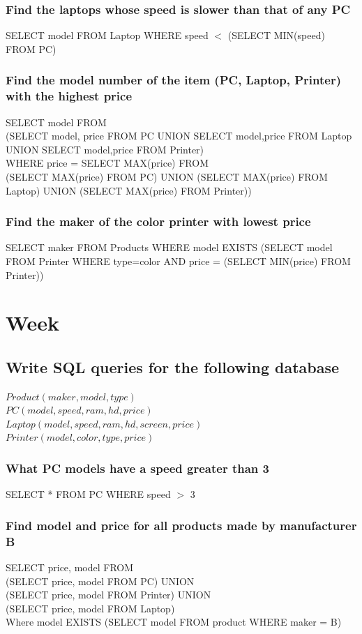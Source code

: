 \documentclass[12pt, a4paper]{article}
\begin{document}
			\subsubsection{Find the laptops whose speed is slower than that of any PC}
				SELECT model FROM Laptop WHERE speed $<$ (SELECT MIN(speed) FROM PC)
			\subsubsection{Find the model number of the item (PC, Laptop, Printer) with the highest price}
				SELECT model FROM \\
					(SELECT model, price FROM PC UNION SELECT model,price FROM Laptop UNION SELECT model,price FROM Printer) \\
					WHERE price = SELECT MAX(price) FROM \\
						(SELECT MAX(price) FROM PC) UNION (SELECT MAX(price) FROM Laptop) UNION  (SELECT MAX(price) FROM Printer)) 
			\subsubsection{Find the maker of the color printer with lowest price}
				SELECT maker FROM Products WHERE model EXISTS (SELECT model FROM Printer WHERE type=color AND price = (SELECT MIN(price) FROM Printer))
	\section{Week}
		\subsection{Write SQL queries for the following database}
			$Product(maker, model, type)$\\
			$PC(model, speed,ram, hd, price)$\\
			$Laptop(model, speed, ram, hd ,screen, price)$\\
			$Printer(model, color, type, price)$
			\subsubsection{What PC models have a speed greater than 3}
				SELECT * FROM PC WHERE speed $>$ 3
			\subsubsection{Find model and price for all products made by manufacturer B}
				SELECT price, model FROM\\
				(SELECT price, model FROM PC) UNION\\
				(SELECT price, model FROM Printer) UNION\\
				(SELECT price, model FROM Laptop)\\				
				Where model EXISTS (SELECT model FROM product WHERE maker = B)
\end{document}
